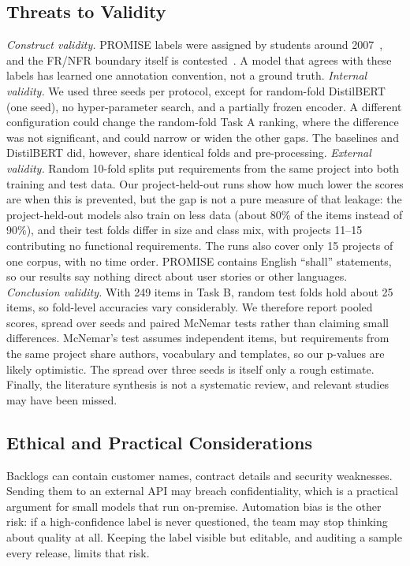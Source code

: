 \documentclass[conference,10pt,letterpaper]{IEEEtran}
\begin{document}
\subsection{Threats to Validity}\label{sec:threats}
\emph{Construct validity.} PROMISE labels were assigned by students around 2007~\cite{clelandhuang2007}, and the FR/NFR boundary itself is contested~\cite{dalpiaz2019}. A model that agrees with these labels has learned one annotation convention, not a ground truth. \emph{Internal validity.} We used three seeds per protocol, except for random-fold DistilBERT (one seed), no hyper-parameter search, and a partially frozen encoder. A different configuration could change the random-fold Task A ranking, where the difference was not significant, and could narrow or widen the other gaps. The baselines and DistilBERT did, however, share identical folds and pre-processing. \emph{External validity.} Random 10-fold splits put requirements from the same project into both training and test data. Our project-held-out runs show how much lower the scores are when this is prevented, but the gap is not a pure measure of that leakage: the project-held-out models also train on less data (about 80\% of the items instead of 90\%), and their test folds differ in size and class mix, with projects 11–15 contributing no functional requirements. The runs also cover only 15 projects of one corpus, with no time order. PROMISE contains English “shall” statements, so our results say nothing direct about user stories or other languages. \emph{Conclusion validity.} With 249 items in Task B, random test folds hold about 25 items, so fold-level accuracies vary considerably. We therefore report pooled scores, spread over seeds and paired McNemar tests rather than claiming small differences. McNemar's test assumes independent items, but requirements from the same project share authors, vocabulary and templates, so our p-values are likely optimistic. The spread over three seeds is itself only a rough estimate. Finally, the literature synthesis is not a systematic review, and relevant studies may have been missed.

\subsection{Ethical and Practical Considerations}
Backlogs can contain customer names, contract details and security weaknesses. Sending them to an external API may breach confidentiality, which is a practical argument for small models that run on-premise. Automation bias is the other risk: if a high-confidence label is never questioned, the team may stop thinking about quality at all. Keeping the label visible but editable, and auditing a sample every release, limits that risk.
\end{document}
